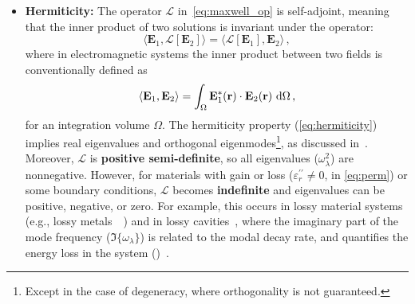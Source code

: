 \begin{itemize}
              \item \textbf{Hermiticity:} The operator $\mathcal{L}$ in~\eqref{eq:maxwell_op}  is self-adjoint,
              meaning that the inner product of two solutions is invariant under the
              operator:
                           \begin{equation}\label{eq:hermiticity}
                             \langle \mathbf{E}_1, \mathcal{L}[\mathbf{E}_2] \rangle = \langle \mathcal{L}[\mathbf{E}_1], \mathbf{E}_2 \rangle\,,
                         \end{equation}
              where in electromagnetic systems the inner product between two fields is conventionally defined as
                         \begin{equation}
                             \langle \mathbf{E}_1, \mathbf{E}_2 \rangle = \int_\Omega \mathbf{E}_1^*(\mathbf{r}) \cdot \mathbf{E}_2(\mathbf{r}) \, \mathop{}\!\text{d}\Omega\,,
                         \end{equation}
              for an integration volume $\Omega$.
              The hermiticity property (\eqref{eq:hermiticity}) implies real eigenvalues and orthogonal eigenmodes\footnote{Except in
              the case of degeneracy, where orthogonality is not guaranteed.}, as discussed
              in~\cite{phot_crys}.
              Moreover, $\mathcal{L}$ is \textbf{positive semi-definite}, so all
              eigenvalues ($\omega_\lambda^2$) are nonnegative. However, for materials with
              gain or loss
              ($\varepsilon_r^{\prime\prime} \neq 0$, in \eqref{eq:perm}) or some boundary conditions, $\mathcal{L}$
              becomes \textbf{indefinite} and eigenvalues can be positive, negative, or zero. For example, this occurs in lossy
              material systems
              (e.g., lossy metals~~\cite{ownpub0}) and in lossy cavities~\cite{ownpub4},
              where the imaginary part of the mode frequency ($\Im\{\omega_\lambda\}$) is
              related to the modal decay rate, and quantifies the energy loss in the system ()~\cite{ownpub0}.


\end{itemize}
